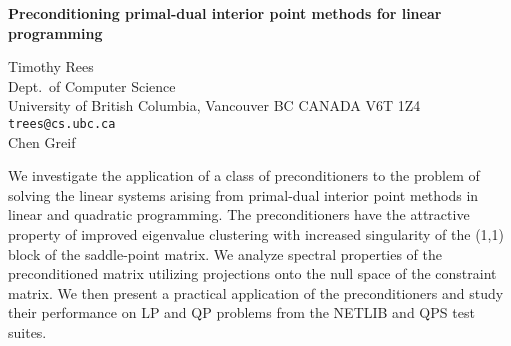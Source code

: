 \documentclass{report}
\begin{document}

\begin{center}
{\large
{\bf Preconditioning primal-dual interior point methods for linear programming}}

	Timothy Rees \\
	Dept.~of Computer Science \\
	University of British Columbia, Vancouver BC CANADA V6T 1Z4 \\
	{\tt trees@cs.ubc.ca} \\
	Chen Greif
\end{center}
We investigate the application of a class of preconditioners
to the problem of solving the linear systems arising from
primal-dual interior point methods in linear and quadratic
programming.  The preconditioners have the attractive
property of improved eigenvalue clustering with increased
singularity of the (1,1) block of the saddle-point matrix.
We analyze spectral properties of the preconditioned matrix
utilizing projections onto the null space of the constraint
matrix.  We then present a practical application of the
preconditioners and study their performance on LP and QP
problems from the NETLIB and QPS test suites.


\end{document}

